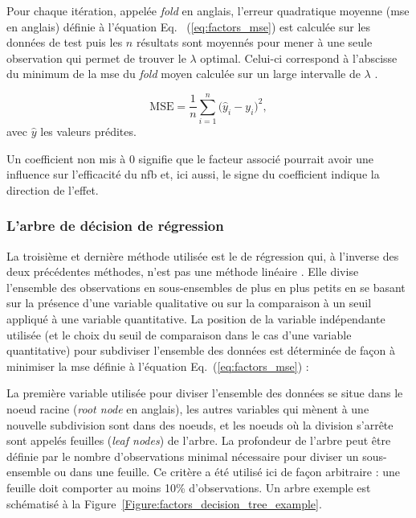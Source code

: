 Pour chaque itération, appelée \textit{fold} en anglais, l'erreur quadratique moyenne (\gls{mse} en anglais) définie à l'équation Eq.
~(\ref{eq:factors_mse}) est calculée sur les données de test
puis les $n$ résultats sont moyennés pour mener à une seule observation qui permet de trouver le $\lambda$ optimal. Celui-ci correspond à l'abscisse du minimum de la \gls{mse} 
du \textit{fold} moyen calculée sur un large intervalle de $\lambda$ \citep{James2013}. 

\begin{equation}
\label{eq:factors_mse}
\text{MSE} = \frac{1}{n}\sum_{i=1}^{n} \Big(\hat{y}_i - {y}_i\Big)^2,
\end{equation}
avec $\hat{y}$ les valeurs prédites.

Un coefficient non mis à 0 signifie que le facteur associé pourrait avoir une influence sur l'efficacité du \gls{nfb} et, ici aussi, 
le signe du coefficient indique la direction de l'effet.

\subsubsection{L'arbre de décision de régression}

La troisième et dernière méthode utilisée est le  de régression qui, à l'inverse des deux précédentes méthodes, n'est pas une méthode 
linéaire \citep{Quinlan1986}. Elle divise l'ensemble des observations en sous-ensembles de plus en plus petits en se basant sur la présence 
d'une variable qualitative ou sur la comparaison à un seuil appliqué à une variable quantitative. La position de la variable indépendante utilisée (et le
choix du seuil de comparaison dans le cas d'une variable quantitative) pour subdiviser l'ensemble des données est déterminée de façon à minimiser la
\gls{mse} définie à l'équation Eq.~(\ref{eq:factors_mse}) :

La première variable utilisée pour diviser l'ensemble des données se situe dans le noeud racine (\textit{root node} en anglais), les autres
variables qui mènent à une nouvelle subdivision sont dans des noeuds, et les noeuds où la division s'arrête sont appelés
feuilles (\textit{leaf nodes}) de l'arbre. La profondeur de l'arbre peut être définie par le nombre d'observations minimal nécessaire
pour diviser un sous-ensemble ou dans une feuille. Ce critère a été utilisé ici de façon arbitraire : une feuille doit comporter au moins 10\% d'observations. 
Un arbre exemple est schématisé à la Figure~\ref{Figure:factors_decision_tree_example}.

